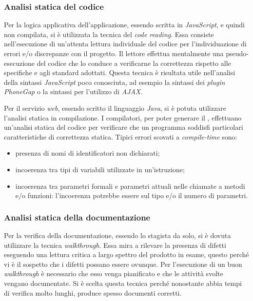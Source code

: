 \subsubsection{Analisi statica del codice}


Per la logica applicativa dell'applicazione, essendo scritta in \textit{JavaScript}, e quindi non compilata, si è utilizzata la tecnica del \textit{code reading}. Essa consiste nell'esecuzione di un'attenta lettura individuale del codice per l'individuazione di errori e/o discrepanze con il progetto. Il lettore effettua mentalmente una pseudo-esecuzione del codice che lo conduce a verificarne la correttezza rispetto alle specifiche e agli standard adottati. Questa tecnica è risultata utile nell'analisi della sintassi \textit{JavaScript} poco conosciuta, ad esempio la sintassi dei \textit{plugin PhoneGap} o la sintassi per l'utilizzo di \textit{AJAX}.


Per il servizio \textit{web}, essendo scritto il linguaggio \textit{Java}, si è potuta utilizzare l'analisi statica in compilazione. I compilatori, per poter generare il , effettuano un'analisi statica del codice per verificare che un programma soddisfi particolari caratteristiche di correttezza statica. Tipici errori scovati a \textit{compile-time} sono:
\begin{itemize}
	\item presenza di nomi di identificatori non dichiarati;
	\item incoerenza tra tipi di variabili utilizzate in un'istruzione;
	\item incoerenza tra parametri formali e parametri attuali nelle chiamate a metodi e/o funzioni: l'incoerenza potrebbe essere sul tipo e/o il numero di parametri.
\end{itemize}

\subsubsection{Analisi statica della documentazione}

Per la verifica della documentazione, essendo lo stagista da solo, si è dovuta utilizzare la tecnica \textit{walkthrough}. Essa mira a rilevare la presenza di difetti eseguendo una lettura critica a largo spettro del prodotto in esame, questo perché vi è il sospetto che i difetti possano essere ovunque. Per l'esecuzione di un buon \textit{walkthrough} è necessario che esso venga pianificato e che le attività svolte vengano documentate. Si è scelta questa tecnica perché nonostante abbia tempi di verifica molto lunghi, produce spesso documenti corretti.

